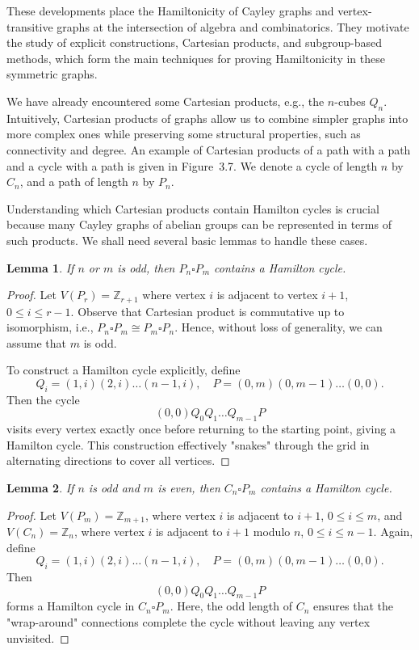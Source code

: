\documentclass[12pt,a4paper,openany]{book}
\newtheorem{lemma}{Lemma}[section]
\begin{document}
These developments place the Hamiltonicity of Cayley graphs and vertex-transitive graphs at the intersection of algebra and combinatorics. They motivate the study of explicit constructions, Cartesian products, and subgroup-based methods, which form the main techniques for proving Hamiltonicity in these symmetric graphs.


We have already encountered some Cartesian products, e.g., the $n$-cubes $Q_n$. 
Intuitively, Cartesian products of graphs allow us to combine simpler graphs into more complex ones while preserving some structural properties, such as connectivity and degree. 
An example of Cartesian products of a path with a path and a cycle with a path is given in Figure~3.7. 
We denote a cycle of length $n$ by $C_n$, and a path of length $n$ by $P_n$. 

Understanding which Cartesian products contain Hamilton cycles is crucial because many Cayley graphs of abelian groups can be represented in terms of such products. 
We shall need several basic lemmas to handle these cases.

\begin{lemma}\label{lem:PnPm}
If $n$ or $m$ is odd, then $P_n \square P_m$ contains a Hamilton cycle.
\end{lemma}

\begin{proof}
Let $V(P_r) = \mathbb{Z}_{r+1}$ where vertex $i$ is adjacent to vertex $i+1$, $0 \le i \le r-1$. 
Observe that Cartesian product is commutative up to isomorphism, i.e., $P_n \square P_m \cong P_m \square P_n$. 
Hence, without loss of generality, we can assume that $m$ is odd.

To construct a Hamilton cycle explicitly, define
\[
Q_i = (1,i)(2,i)\dots (n-1,i), \quad P = (0,m)(0,m-1)\dots(0,0).
\]
Then the cycle
\[
(0,0) Q_0 Q_1 \dots Q_{m-1} P
\]
visits every vertex exactly once before returning to the starting point, giving a Hamilton cycle. 
This construction effectively "snakes" through the grid in alternating directions to cover all vertices.
\end{proof}

\begin{lemma}\label{lem:CnPm}
If $n$ is odd and $m$ is even, then $C_n \square P_m$ contains a Hamilton cycle.
\end{lemma}

\begin{proof}
Let $V(P_m) = \mathbb{Z}_{m+1}$, where vertex $i$ is adjacent to $i+1$, $0 \le i \le m$, 
and $V(C_n) = \mathbb{Z}_n$, where vertex $i$ is adjacent to $i+1$ modulo $n$, $0 \le i \le n-1$. 
Again, define
\[
Q_i = (1,i)(2,i)\dots (n-1,i), \quad P = (0,m)(0,m-1)\dots (0,0).
\]
Then
\[
(0,0) Q_0 Q_1 \dots Q_{m-1} P
\]
forms a Hamilton cycle in $C_n \square P_m$. 
Here, the odd length of $C_n$ ensures that the "wrap-around" connections complete the cycle without leaving any vertex unvisited.
\end{proof}
\end{document}
